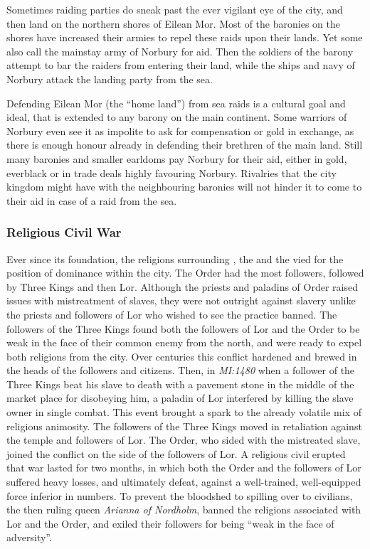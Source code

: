 Sometimes raiding parties do sneak past the ever vigilant eye of the city,
and then land on the northern shores of Eilean Mor. Most of the baronies
on the shores have increased their armies to repel these raids upon their
lands. Yet some also call the mainstay army of Norbury for aid. Then the
soldiers of the barony attempt to bar the raiders from entering their land,
while the ships and navy of Norbury attack the landing party from the sea.

Defending Eilean Mor (the ``home land'') from sea raids is a cultural goal and
ideal, that is extended to any barony on the main continent. Some warriors of
Norbury even see it as impolite to ask for compensation or gold in exchange,
as there is enough honour already in defending their brethren of the main
land. Still many baronies and smaller earldoms pay Norbury for their aid,
either in gold, everblack or in trade deals highly favouring Norbury. Rivalries
that the city kingdom might have with the neighbouring baronies will not
hinder it to come to their aid in case of a raid from the sea.

\subsubsection{Religious Civil War}
\label{sec:Religious Civil War}

Ever since its foundation, the religions surrounding , the
 and the  vied for the position of
dominance within the city. The Order had the most followers, followed by Three
Kings and then Lor. Although the priests and paladins of Order raised issues
with mistreatment of slaves, they were not outright against slavery unlike
the priests and followers of Lor who wished to see the practice banned. The
followers of the Three Kings found both the followers of Lor and the Order to
be weak in the face of their common enemy from the north, and were ready to
expel both religions from the city. Over centuries this conflict hardened and
brewed in the heads of the followers and citizens. Then, in \emph{MI:1480}
when a follower of the Three Kings beat his slave to death with a pavement
stone in the middle of the market place for disobeying him, a paladin of Lor
interfered by killing the slave owner in single combat. This event brought a
spark to the already volatile mix of religious animosity. The followers of the
Three Kings moved in retaliation against the temple and followers of Lor. The
Order, who sided with the mistreated slave, joined the conflict on the side of
the followers of Lor. A religious civil erupted that war lasted for two
months, in which both the Order and the followers of Lor suffered heavy losses,
and ultimately defeat, against a well-trained, well-equipped force inferior in
numbers. To prevent the bloodshed to spilling over to civilians, the then
ruling queen \emph{Arianna of Nordholm}, banned the religions associated with
Lor and the Order, and exiled their followers for being ``weak in the face of
adversity''.

